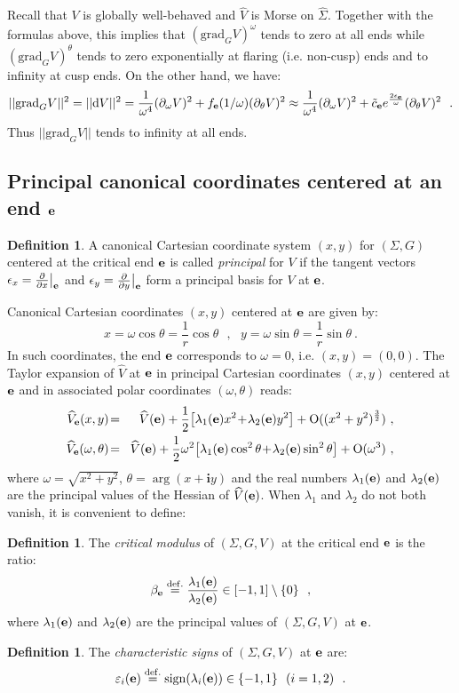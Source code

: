 \documentclass[a4paper,11pt]{article}
\theoremstyle{plain}
\theoremstyle{definition}
\newtheorem{definition}[thm]{Definition}
\theoremstyle{remark}
\newcommand{\be}{\begin{equation*}}
\newcommand{\ee}{\end{equation*}}
\newcommand{\beqan}{\begin{eqnarray}}
\newcommand{\eeqan}{\end{eqnarray}}
\newcommand{\nn}{\nonumber}
\def\i{\mathbf{i}}
\def\hV{\widehat{V}}
\newcommand{\pd}{\partial}
\def\dd{\mathrm{d}}
\newcommand{\sign}{\mathrm{sign}}
\def\e{{\bf e}}
\newcommand{\eqdef}{\stackrel{{\rm def.}}{=}}
\def\grad{\mathrm{grad}}
\def\O{\mathrm{O}}
\def\hSigma{\widehat{\Sigma}}
\def\hV{\widehat{V}}
\def\bvert{\big{\vert}}
\begin{document}
Recall that $V$ is globally well-behaved and $\hV$ is Morse on
$\hSigma$. Together with the formulas above, this implies that
$(\grad_G V)^\omega$ tends to zero at all ends while $(\grad_G
V)^\theta$ tends to zero exponentially at flaring (i.e. non-cusp) ends
and to infinity at cusp ends. On the other hand, we have:
\be
\label{nue}
||\grad_G V||^2=||\dd V||^2=\frac{1}{\omega^4} (\partial_\omega V)^2+f_\e(1/\omega) (\partial_\theta V)^2\approx \frac{1}{\omega^4} (\partial_\omega V)^2+ {\tilde c}_\e e^{\frac{2\epsilon_\e}{\omega}} (\partial_\theta V)^2~~.
\ee
Thus $||\grad_G V||$ tends to infinity at all ends.


\subsection{Principal canonical coordinates centered at an end $\e$}

\begin{definition}
A canonical Cartesian coordinate system $(x,y)$ for $(\Sigma,G)$
centered at the critical end $\e$ is called {\em principal} for $V$ if
the tangent vectors $\epsilon_x=\frac{\pd}{\pd x}\bvert_\e$ and
$\epsilon_y=\frac{\pd}{\pd y}\bvert_\e$ form a principal basis for $V$
at $\e$.
\end{definition}


\noindent Canonical Cartesian coordinates $(x,y)$ centered at $\e$ are given by:
\be
x=\omega\cos \theta=\frac{1}{r}\cos \theta~~~ ,~~~ y=\omega\sin\theta=\frac{1}{r}\sin\theta~.
\ee
In such coordinates, the end $\e$ corresponds to $\omega=0$,
i.e. $(x,y)=(0,0)$. The Taylor expansion of  $\hV$ at $\e$ in principal Cartesian coordinates $(x,y)$ centered at $\e$ and in  associated polar coordinates $(\omega,\theta)$ reads:
\beqan
\label{Vase}
\hV_\e(x,y)\!&=&\hV(\e)+\frac{1}{2}\!\left[\lambda_1(\e) x^2\!+\!\lambda_2(\e) y^2\right]+\O((x^2+y^2)^\frac{3}{2})~,\nn\\
\!\!\hV_\e(\omega,\theta)\!&=&\!\hV(\e)+\frac{1}{2}\omega^2\!\left[\lambda_1(\e) \cos^2 \theta\!+\!\lambda_2(\e)\sin^2 \theta\right]+\O(\omega^3)~,
\eeqan
where $\omega=\sqrt{x^2+y^2}$, $\theta= \arg(x+\i y)$ and the real numbers $\lambda_1(\e)$ and
$\lambda_2(\e)$ are the
principal values of the Hessian of $\hV(\e)$. When $\lambda_1$ and $\lambda_2$ do not
both vanish, it is convenient to define:


\begin{definition}
The {\em critical modulus} of $(\Sigma,\!G,\!V)$ at the
critical end $\e$ is the ratio:
\be
\label{beta}
\beta_\e\eqdef \frac{\lambda_1(\e)}{\lambda_2(\e)}\in [-1,1]\setminus \{0\}~~,
\ee
where $\lambda_1(\e)$ and $\lambda_2(\e)$ are the principal values of
$(\Sigma,G,V)$ at $\e$. 
\end{definition}
\begin{definition}
The {\em characteristic signs} of $(\Sigma,G,V)$ at $\e$ are:
\be
\varepsilon_i(\e)\eqdef \sign(\lambda_i(\e))\in \{-1,1\}~~(i=1,2)~~.
\ee
\end{definition}
\end{document}
